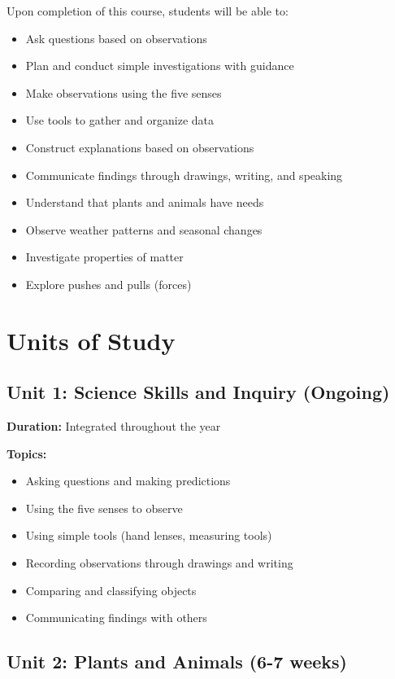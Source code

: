 \documentclass[11pt,letterpaper]{report}
\begin{document}
Upon completion of this course, students will be able to:

\begin{itemize}
    \item Ask questions based on observations
    \item Plan and conduct simple investigations with guidance
    \item Make observations using the five senses
    \item Use tools to gather and organize data
    \item Construct explanations based on observations
    \item Communicate findings through drawings, writing, and speaking
    \item Understand that plants and animals have needs
    \item Observe weather patterns and seasonal changes
    \item Investigate properties of matter
    \item Explore pushes and pulls (forces)
\end{itemize}

\section{Units of Study}

\subsection{Unit 1: Science Skills and Inquiry (Ongoing)}

\textbf{Duration:} Integrated throughout the year

\textbf{Topics:}
\begin{itemize}
    \item Asking questions and making predictions
    \item Using the five senses to observe
    \item Using simple tools (hand lenses, measuring tools)
    \item Recording observations through drawings and writing
    \item Comparing and classifying objects
    \item Communicating findings with others
\end{itemize}

\subsection{Unit 2: Plants and Animals (6-7 weeks)}
\end{document}
